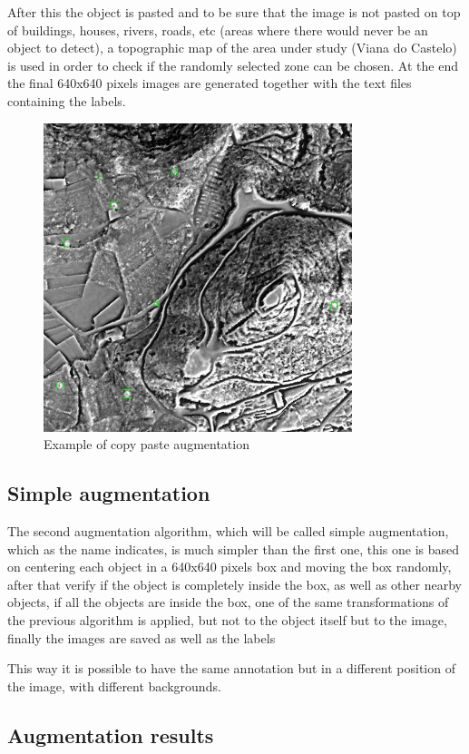 After this the object is pasted and to be sure that the image is not pasted on top of buildings, houses, rivers, roads, etc (areas where there would never be an object to detect), a topographic map of the area under study (Viana do Castelo) is used in order to check if the randomly selected zone can be chosen. At the end the final 640x640 pixels images are generated together with the text files containing the labels.

\begin{figure}[H]
\centering
\includegraphics[height=9cm]{images/mamoas_aug_example.png}
\caption{Example of copy paste augmentation}
\end{figure}

\subsection{Simple augmentation}
The second augmentation algorithm, which will be called simple augmentation, which as the name indicates, is much simpler than the first one, this one is based on centering each object in a 640x640 pixels box and moving the box randomly, after that verify if the object is completely inside the box, as well as other nearby objects, if all the objects are inside the box, one of the same transformations of the previous algorithm is applied, but not to the object itself but to the image, finally the images are saved as well as the labels

This way it is possible to have the same annotation but in a different position of the image, with different backgrounds.

\subsection{Augmentation results}

